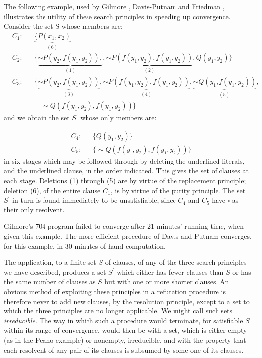 \documentclass[8pt]{extarticle}
\begin{document}
The following example, used by Gilmore \cite{gilmore_1960}, Davis-Putnam \cite{davis_1960} and Friedman \cite{friedman_1963}, illustrates the utility of these search principles in speeding up convergence.\\
\noindent
Consider the set S whose members are: 
\begin{align*}
    & C_1 : && \underbrace{\{P(x_1,x_2)}_{(6)} \\
    & C_2 : && \{\underbrace{\sim P(y_2,f(y_1,y_2)),}_{(1)}, \underbrace{\sim P(f(y_1,y_2),f(y_1,y_2))}_{(2)}, Q(y_1,y_2)\} \\
    & C_3 : && \{\underbrace{\sim P(y_2, f(y_1,y_2))}_{(3)}, \underbrace{\sim P(f(y_1,y_2),f(y_1,y_2))}_{(4)},
        \underbrace{\sim Q(y_1,f(y_1,y_2))}_{(5)}, \\ & && \quad \sim Q(f(y_1,y_2),f(y_1,y_2))\}
\end{align*}
\noindent
and we obtain the set $S^\prime$ whose only members are:

\begin{align*}
    & C_4 : && \{Q(y_1,y_2)\} \\
    & C_5 : && \{\sim Q(f(y_1, y_2), f(y_1, y_2))\}
\end{align*}
\noindent
in six stages which may be followed through by deleting the underlined literals, and the underlined clause, in the order indicated. This gives the set of clauses at each stage. Deletions (1) through (5) are by virtue of the replacement principle; deletion (6), of the entire clause $C_1$, is by virtue of the purity principle. The set $S^\prime$ in turn is found immediately to be unsatisfiable, since $C_4$ and $C_5$ have $\square$ as their only resolvent.

Gilmore's 704 program failed to converge after 21 minutes' running time, when given this example. The more efficient procedure of Davis and Putnam converges, for this example, in 30 minutes of hand computation.

The application, to a finite set $S$ of clauses, of any of the three search principles we have described, produces a set $S^\prime$ which either has fewer clauses than $S$ or has the same number of clauses as $S$ but with one or more shorter clauses. An obvious method of exploiting these principles in a refutation procedure is therefore never to add new clauses, by the resolution principle, except to a set to which the three principles are no longer applicable. We might call such sets \emph{irreducible}. The way in which such a procedure would terminate, for satisfiable 
$S$ within its range of convergence, would then be with a set, which is either empty (as in the Peano example) or nonempty, irreducible, and with the property that each resolvent of any pair of its clauses is subsumed by some one of its clauses. 
\end{document}
